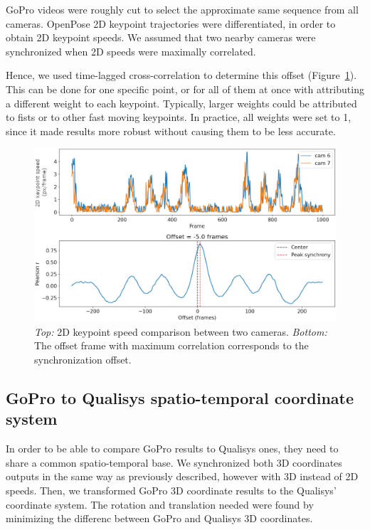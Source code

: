 GoPro videos were roughly cut to select the approximate same sequence from all cameras. OpenPose 2D keypoint trajectories were differentiated, in order to obtain 2D keypoint speeds. We assumed that two nearby cameras were synchronized when 2D speeds were maximally correlated. 

Hence, we used time-lagged cross-correlation to determine this offset (Figure~\ref{fig_sync}). This can be done for one specific point, or for all of them at once with attributing a different weight to each keypoint. Typically, larger weights could be attributed to fists or to other fast moving keypoints. In practice, all weights were set to 1, since it made results more robust without causing them to be less accurate.

\begin{figure}[!ht]
	\centering
	\def\svgwidth{1\columnwidth}
	\fontsize{10pt}{10pt}\selectfont
	\includegraphics[width=\linewidth]{"../Chap6/Figures/Fig_Sync.png"}
	\caption{\textit{Top:} 2D keypoint speed comparison between two cameras. \textit{Bottom:} The offset frame with maximum correlation corresponds to the synchronization offset.}
      \label{fig_sync}
\end{figure}


\FloatBarrier
\subsection{GoPro to Qualisys spatio-temporal coordinate system}

In order to be able to compare GoPro results to Qualisys ones, they need to share a common spatio-temporal base. We synchronized both 3D coordinates outputs in the same way as previously described, however with 3D instead of 2D speeds. Then, we transformed GoPro 3D coordinate results to the Qualisys' coordinate system. The rotation and translation needed were found by minimizing the differenc between GoPro and Qualisys 3D coordinates.


